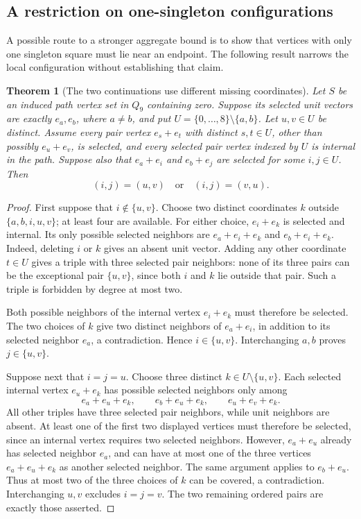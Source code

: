 \documentclass[11pt,a4paper]{article}
\newtheorem{theorem}{Theorem}[section]
\theoremstyle{definition}
\theoremstyle{remark}
\newcommand{\Q}{Q}
\begin{document}
\subsection{A restriction on one-singleton configurations}
A possible route to a stronger aggregate bound is to show that vertices with only one singleton square must lie near an endpoint. The following result narrows the local configuration without establishing that claim.

\begin{theorem}[The two continuations use different missing coordinates]\label{thm:split-arms}
Let $S$ be an induced path vertex set in $\Q_9$ containing zero. Suppose its selected unit vectors are exactly $e_a,e_b$, where $a\ne b$, and put $U=\{0,\ldots,8\}\setminus\{a,b\}$. Let $u,v\in U$ be distinct. Assume every pair vertex $e_s+e_t$ with distinct $s,t\in U$, other than possibly $e_u+e_v$, is selected, and every selected pair vertex indexed by $U$ is internal in the path. Suppose also that $e_a+e_i$ and $e_b+e_j$ are selected for some $i,j\in U$. Then
\[
(i,j)=(u,v)\quad\text{or}\quad(i,j)=(v,u).
\]
\end{theorem}
\begin{proof}
First suppose that $i\notin\{u,v\}$. Choose two distinct coordinates $k$ outside $\{a,b,i,u,v\}$; at least four are available. For either choice, $e_i+e_k$ is selected and internal. Its only possible selected neighbors are $e_a+e_i+e_k$ and $e_b+e_i+e_k$. Indeed, deleting $i$ or $k$ gives an absent unit vector. Adding any other coordinate $t\in U$ gives a triple with three selected pair neighbors: none of its three pairs can be the exceptional pair $\{u,v\}$, since both $i$ and $k$ lie outside that pair. Such a triple is forbidden by degree at most two.

Both possible neighbors of the internal vertex $e_i+e_k$ must therefore be selected. The two choices of $k$ give two distinct neighbors of $e_a+e_i$, in addition to its selected neighbor $e_a$, a contradiction. Hence $i\in\{u,v\}$. Interchanging $a,b$ proves $j\in\{u,v\}$.

Suppose next that $i=j=u$. Choose three distinct $k\in U\setminus\{u,v\}$. Each selected internal vertex $e_u+e_k$ has possible selected neighbors only among
\[
e_a+e_u+e_k,\qquad e_b+e_u+e_k,\qquad e_u+e_v+e_k.
\]
All other triples have three selected pair neighbors, while unit neighbors are absent. At least one of the first two displayed vertices must therefore be selected, since an internal vertex requires two selected neighbors. However, $e_a+e_u$ already has selected neighbor $e_a$, and can have at most one of the three vertices $e_a+e_u+e_k$ as another selected neighbor. The same argument applies to $e_b+e_u$. Thus at most two of the three choices of $k$ can be covered, a contradiction. Interchanging $u,v$ excludes $i=j=v$. The two remaining ordered pairs are exactly those asserted.
\end{proof}
\end{document}
